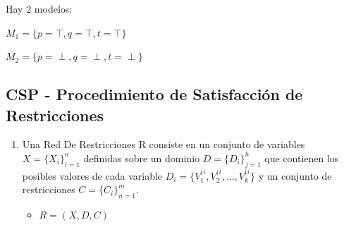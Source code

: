 \documentclass[12pt, twoside, openright]{report} %
\begin{document}
Hay 2 modelos:

$M_1= \{ p= \top, q=\top, t=\top \}$

$M_2= \{ p= \perp, q=\perp, t=\perp \}$

\subsection{CSP - Procedimiento de Satisfacción de Restricciones}

  \begin{enumerate}
  \def\labelenumi{\arabic{enumi}.}
  \item
    Una Red De Restricciones R consiste en un conjunto de variables
    \(X=\{ X_i \}^n_{i=1}\) definidas sobre un dominio
    \(D=\{ D_i \}^h_{j=1}\) que contienen los posibles valores de cada
    variable \(D_i=\{ V_1^{(i}, V_2^{(i}, ..., V_k^{(i} \}\) y un
    conjunto de restricciones \(C=\{ C_i \}^m_{n=1}\).

    \begin{itemize}
  
    \item
      \(R = (X, D, C)\)
    \end{itemize}
  \end{enumerate}
\end{document}
